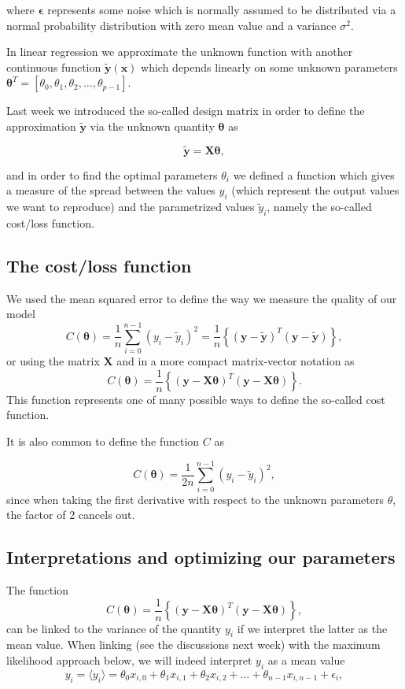 \documentclass[%
oneside,                 %
final,                   %
10pt]{article}
\begin{document}
where $\bm{\epsilon}$ represents some noise which is normally assumed to
be distributed via a normal probability distribution with zero mean
value and a variance $\sigma^2$.

In linear regression we approximate the unknown function with another
continuous function $\tilde{\bm{y}}(\bm{x})$ which depends linearly on
some unknown parameters
$\bm{\theta}^T=[\theta_0,\theta_1,\theta_2,\dots,\theta_{p-1}]$.

Last week we introduced the so-called design matrix in order to define
the approximation $\bm{\tilde{y}}$ via the unknown quantity
$\bm{\theta}$ as

\[
\bm{\tilde{y}}= \bm{X}\bm{\theta},
\]

and in order to find the optimal parameters $\theta_i$ we defined a function which
gives a measure of the spread between the values $y_i$ (which
represent the output values we want to reproduce) and the parametrized
values $\tilde{y}_i$, namely the so-called cost/loss function.

\subsection{The cost/loss function}

We used the mean squared error to define the way we measure the quality of our model
\[
C(\bm{\theta})=\frac{1}{n}\sum_{i=0}^{n-1}\left(y_i-\tilde{y}_i\right)^2=\frac{1}{n}\left\{\left(\bm{y}-\bm{\tilde{y}}\right)^T\left(\bm{y}-\bm{\tilde{y}}\right)\right\},
\]
or using the matrix $\bm{X}$ and in a more compact matrix-vector notation as
\[
C(\bm{\theta})=\frac{1}{n}\left\{\left(\bm{y}-\bm{X}\bm{\theta}\right)^T\left(\bm{y}-\bm{X}\bm{\theta}\right)\right\}.
\]
This function represents one of many possible ways to define the so-called cost function.

It is also common to define
the function $C$ as

\[
C(\bm{\theta})=\frac{1}{2n}\sum_{i=0}^{n-1}\left(y_i-\tilde{y}_i\right)^2,
\]
since when taking the first derivative with respect to the unknown parameters $\theta$, the factor of $2$ cancels out. 

\subsection{Interpretations and optimizing our parameters}

The function 
\[
C(\bm{\theta})=\frac{1}{n}\left\{\left(\bm{y}-\bm{X}\bm{\theta}\right)^T\left(\bm{y}-\bm{X}\bm{\theta}\right)\right\},
\]
can be linked to the variance of the quantity $y_i$ if we interpret the latter as the mean value. 
When linking (see the discussions next week) with the maximum likelihood approach below, we will indeed interpret $y_i$ as a mean value
\[
y_{i}=\langle y_i \rangle = \theta_0x_{i,0}+\theta_1x_{i,1}+\theta_2x_{i,2}+\dots+\theta_{n-1}x_{i,n-1}+\epsilon_i,
\]
\end{document}
